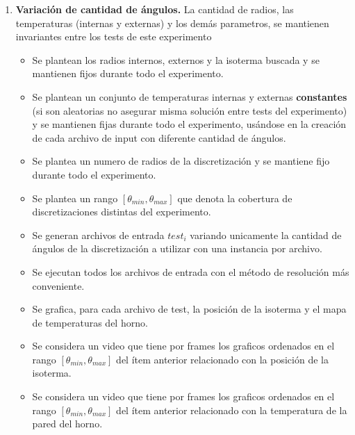 \begin{enumerate}
    \item \textbf{Variación de cantidad de ángulos.} La cantidad de radios, las temperaturas (internas y externas) y los demás parametros, se mantienen invariantes entre los tests de este experimento\begin{itemize}
        \item Se plantean los radios internos, externos y la isoterma buscada y se mantienen fijos durante todo el experimento.
        \item Se plantean un conjunto de temperaturas internas y externas \textbf{constantes} (si son aleatorias no asegurar misma solución entre tests del experimento) y se mantienen fijas durante todo el experimento, usándose en la creación de cada archivo de input con diferente cantidad de ángulos.
        \item Se plantea un numero de radios de la discretización y se mantiene fijo durante todo el experimento. 
        \item Se plantea un rango $[\theta_{min}, \theta_{max}]$ que denota la cobertura de discretizaciones distintas del experimento.
        \item Se generan archivos de entrada $test_i$ variando unicamente la cantidad de ángulos de la discretización a utilizar con una instancia por archivo.
        \item Se ejecutan todos los archivos de entrada con el método de resolución más conveniente.
        \item Se grafica, para cada archivo de test, la posición de la isoterma y el mapa de temperaturas del horno.
        \item Se considera un video que tiene por frames los graficos ordenados en el rango $[\theta_{min}, \theta_{max}]$ del ítem anterior relacionado con la posición de la isoterma.
        \item Se considera un video que tiene por frames los graficos ordenados en el rango $[\theta_{min}, \theta_{max}]$ del ítem anterior relacionado con la temperatura de la pared del horno.
    \end{itemize}    


\end{enumerate}
